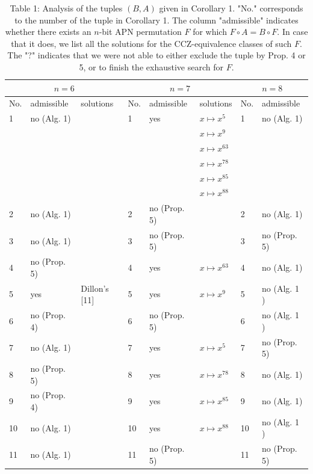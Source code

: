 \documentclass[10pt]{article}
\begin{document}
\begin{table}[h]
\begin{center}
\captionsetup{labelformat=empty}
\caption{Table 1: Analysis of the tuples $(B, A)$ given in Corollary 1. "No." corresponds to the number of the tuple in Corollary 1. The column "admissible" indicates whether there exists an $n$-bit APN permutation $F$ for which $F \circ A=B \circ F$. In case that it does, we list all the solutions for the CCZ-equivalence classes of such $F$. The "?" indicates that we were not able to either exclude the tuple by Prop. 4 or 5, or to finish the exhaustive search for $F$.}
\begin{tabular}{|l|l|l|l|l|l|l|l|}
\hline
\multicolumn{3}{|c|}{$n=6$} & \multicolumn{3}{|c|}{$n=7$} & \multicolumn{2}{|c|}{$n=8$} \\
\hline
No. & admissible & solutions & No. & admissible & solutions & No. & admissible \\
\hline
1 & no (Alg. 1) &  & 1 & yes & $x \mapsto x^{5}$ & 1 & no (Alg. 1) \\
\hline
 &  &  &  &  & $x \mapsto x^{9}$ &  &  \\
\hline
 &  &  &  &  & $x \mapsto x^{63}$ &  &  \\
\hline
 &  &  &  &  & $x \mapsto x^{78}$ &  &  \\
\hline
 &  &  &  &  & $x \mapsto x^{85}$ &  &  \\
\hline
 &  &  &  &  & $x \mapsto x^{88}$ &  &  \\
\hline
2 & no (Alg. 1) &  & 2 & no (Prop. 5) &  & 2 & no (Alg. 1) \\
\hline
3 & no (Alg. 1) &  & 3 & no (Prop. 5) &  & 3 & no (Prop. 5) \\
\hline
4 & no (Prop. 5) &  & 4 & yes & $x \mapsto x^{63}$ & 4 & no (Alg. 1) \\
\hline
5 & yes & Dillon's [11] & 5 & yes & $x \mapsto x^{9}$ & 5 & no (Alg. 1 ) \\
\hline
6 & no (Prop. 4) &  & 6 & no (Prop. 5) &  & 6 & no (Alg. 1 ) \\
\hline
7 & no (Alg. 1) &  & 7 & yes & $x \mapsto x^{5}$ & 7 & no (Prop. 5) \\
\hline
8 & no (Prop. 5) &  & 8 & yes & $x \mapsto x^{78}$ & 8 & no (Alg. 1) \\
\hline
9 & no (Prop. 4) &  & 9 & yes & $x \mapsto x^{85}$ & 9 & no (Alg. 1) \\
\hline
10 & no (Alg. 1) &  & 10 & yes & $x \mapsto x^{88}$ & 10 & no (Alg. 1 ) \\
\hline
11 & no (Alg. 1) &  & 11 & no (Prop. 5) &  & 11 & no (Prop. 5) \\

\end{tabular}
\end{center}
\end{table}
\end{document}
